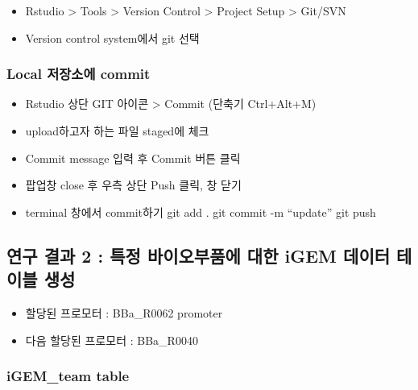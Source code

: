 \documentclass[
]{article}
\providecommand{\tightlist}{%
  \setlength{\itemsep}{0pt}\setlength{\parskip}{0pt}}
\begin{document}
\begin{itemize}
\tightlist
\item
  Rstudio \textgreater{} Tools \textgreater{} Version Control
  \textgreater{} Project Setup \textgreater{} Git/SVN
\item
  Version control system에서 git 선택
\end{itemize}

\hypertarget{local-uxc800uxc7a5uxc18cuxc5d0-commit}{%
\subsubsection{Local 저장소에
commit}\label{local-uxc800uxc7a5uxc18cuxc5d0-commit}}

\begin{itemize}
\tightlist
\item
  Rstudio 상단 GIT 아이콘 \textgreater{} Commit (단축기 Ctrl+Alt+M)
\item
  upload하고자 하는 파일 staged에 체크
\item
  Commit message 입력 후 Commit 버튼 클릭
\item
  팝업창 close 후 우측 상단 Push 클릭, 창 닫기
\item
  terminal 창에서 commit하기 git add . git commit -m ``update'' git push
\end{itemize}

\hypertarget{uxc5f0uxad6c-uxacb0uxacfc-2-uxd2b9uxc815-uxbc14uxc774uxc624uxbd80uxd488uxc5d0-uxb300uxd55c-igem-uxb370uxc774uxd130-uxd14cuxc774uxbe14-uxc0dduxc131}{%
\subsection{연구 결과 2 : 특정 바이오부품에 대한 iGEM 데이터 테이블
생성}\label{uxc5f0uxad6c-uxacb0uxacfc-2-uxd2b9uxc815-uxbc14uxc774uxc624uxbd80uxd488uxc5d0-uxb300uxd55c-igem-uxb370uxc774uxd130-uxd14cuxc774uxbe14-uxc0dduxc131}}

\begin{itemize}
\tightlist
\item
  할당된 프로모터 : BBa\_R0062 promoter
\item
  다음 할당된 프로모터 : BBa\_R0040
\end{itemize}

\hypertarget{igem_team-table}{%
\subsubsection{iGEM\_team table}\label{igem_team-table}}
\end{document}
